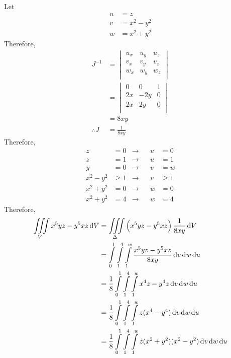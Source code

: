 \documentclass[fleqn, a4paper, 12pt, twoside]{article}
\theoremstyle{definition}
\theoremstyle{theorem}
\begin{document}
\begin{solution}
	Let
	\begin{align*}
		u & = z         \\
		v & = x^2 - y^2 \\
		w & = x^2 + y^2
	\end{align*}
	Therefore,
	\begin{align*}
		J^{-1} &=
			\begin{vmatrix}
				u_x & u_y & u_z \\
				v_x & v_y & v_z \\
				w_x & w_y & w_z \\
			\end{vmatrix}\\
		&=
			\begin{vmatrix}
				0   & 0    & 1 \\
				2 x & -2 y & 0 \\
				2 x & 2 y  & 0 \\
			\end{vmatrix}\\
		&= 8 x y\\
		\therefore J &= \frac{1}{8 x y}
	\end{align*}
	Therefore,
	\begin{align*}
		z         & = 0   & \to &  & u & = 0   \\
		z         & = 1   & \to &  & u & = 1   \\
		y         & = 0   & \to &  & v & = w   \\
		x^2 - y^2 & \ge 1 & \to &  & v & \ge 1 \\
		x^2 + y^2 & = 0   & \to &  & w & = 0   \\
		x^2 + y^2 & = 4   & \to &  & w & = 4
	\end{align*}
	Therefore,
	\begin{align*}
		\iiint\limits_{V} x^5 y z - y^5 x z \dif V &= \iiint\limits_{\Delta} \left( x^5 y z - y^5 x z \right) \frac{1}{8 x y} \dif V\\
		&= \int\limits_{0}^{1} \int\limits_{1}^{4} \int\limits_{1}^{w} \frac{x^5 y z - y^5 x z}{8 x y} \dif v \dif w \dif u\\
		&= \frac{1}{8} \int\limits_{0}^{1} \int\limits_{1}^{4} \int\limits_{1}^{w} x^4 z - y^4 z \dif v \dif w \dif u\\
		&= \frac{1}{8} \int\limits_{0}^{1} \int\limits_{1}^{4} \int\limits_{1}^{w} z (x^4 - y^4) \dif v \dif w \dif u\\
		&= \frac{1}{8} \int\limits_{0}^{1} \int\limits_{1}^{4} \int\limits_{1}^{w} z (x^2 + y^2) (x^2 - y^2) \dif v \dif w \dif u\\

\end{align*}
\end{solution}
\end{document}
